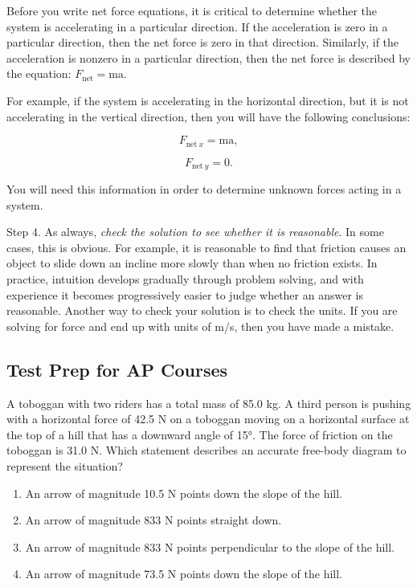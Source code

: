 \documentclass[
]{book}
\providecommand{\tightlist}{%
  \setlength{\itemsep}{0pt}\setlength{\parskip}{0pt}}
\begin{document}
Before you write net force equations, it is critical to determine
whether the system is accelerating in a particular direction. If the
acceleration is zero in a particular direction, then the net force is
zero in that direction. Similarly, if the acceleration is nonzero in a
particular direction, then the net force is described by the equation:
\({F_{\text{net}} = \text{ma}}{}\).

For example, if the system is accelerating in the horizontal direction,
but it is not accelerating in the vertical direction, then you will have
the following conclusions:

\leavevmode{}%
\[{F_{\text{net}\ x} = \text{ma}},\]

\leavevmode{}%
\[{F_{\text{net}\ y} = 0}.\]

You will need this information in order to determine unknown forces
acting in a system.

Step 4. As always, \emph{check the solution to see whether it is reasonable}.
In some cases, this is obvious. For example, it is reasonable to find
that friction causes an object to slide down an incline more slowly than
when no friction exists. In practice, intuition develops gradually
through problem solving, and with experience it becomes progressively
easier to judge whether an answer is reasonable. Another way to check
your solution is to check the units. If you are solving for force and
end up with units of m/s, then you have made a mistake.

\hypertarget{fs-id2154547}{}
\hypertarget{test-prep-for-ap-courses-12}{%
\subsection{Test Prep for AP Courses}\label{test-prep-for-ap-courses-12}}

\hypertarget{fs-id1642540}{}
\leavevmode{}%
A toboggan with two riders has a total mass of 85.0 kg. A third person
is pushing with a horizontal force of 42.5 N on a toboggan moving on a
horizontal surface at the top of a hill that has a downward angle of
15°. The force of friction on the toboggan is 31.0 N. Which statement
describes an accurate free-body diagram to represent the situation?

\begin{enumerate}
\def\labelenumi{\alph{enumi}.}
\tightlist
\item
  An arrow of magnitude 10.5 N points down the slope of the hill.
\item
  An arrow of magnitude 833 N points straight down.
\item
  An arrow of magnitude 833 N points perpendicular to the slope of the
  hill.
\item
  An arrow of magnitude 73.5 N points down the slope of the hill.
\end{enumerate}
\end{document}
